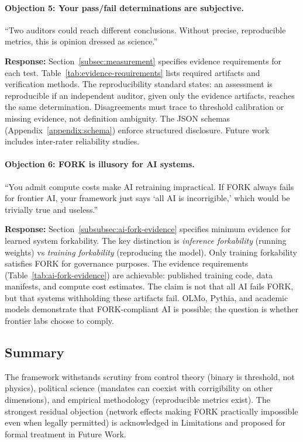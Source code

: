\documentclass{article}
\begin{document}
\paragraph{Objection 5: Your pass/fail determinations are subjective.}
``Two auditors could reach different conclusions. Without precise, reproducible metrics, this is opinion dressed as science.''

\textbf{Response:} Section~\ref{subsec:measurement} specifies evidence requirements for each test. Table~\ref{tab:evidence-requirements} lists required artifacts and verification methods. The reproducibility standard states: an assessment is reproducible if an independent auditor, given only the evidence artifacts, reaches the same determination. Disagreements must trace to threshold calibration or missing evidence, not definition ambiguity. The JSON schemas (Appendix~\ref{appendix:schema}) enforce structured disclosure. Future work includes inter-rater reliability studies.

\paragraph{Objection 6: FORK is illusory for AI systems.}
``You admit compute costs make AI retraining impractical. If FORK always fails for frontier AI, your framework just says `all AI is incorrigible,' which would be trivially true and useless.''

\textbf{Response:} Section~\ref{subsubsec:ai-fork-evidence} specifies minimum evidence for learned system forkability. The key distinction is \textit{inference forkability} (running weights) vs \textit{training forkability} (reproducing the model). Only training forkability satisfies FORK for governance purposes. The evidence requirements (Table~\ref{tab:ai-fork-evidence}) are achievable: published training code, data manifests, and compute cost estimates. The claim is not that all AI fails FORK, but that systems withholding these artifacts fail. OLMo, Pythia, and academic models demonstrate that FORK-compliant AI is possible; the question is whether frontier labs choose to comply.

\subsection{Summary}

The framework withstands scrutiny from control theory (binary is threshold, not physics), political science (mandates can coexist with corrigibility on other dimensions), and empirical methodology (reproducible metrics exist). The strongest residual objection (network effects making FORK practically impossible even when legally permitted) is acknowledged in Limitations and proposed for formal treatment in Future Work.
\end{document}
